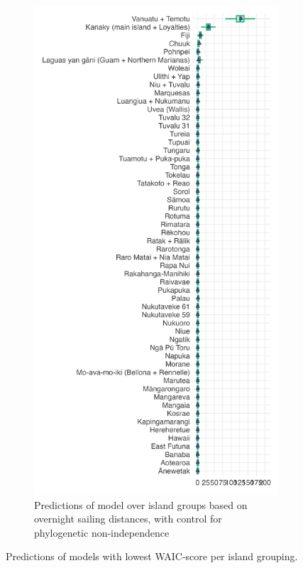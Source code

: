 \documentclass[unnumsec,webpdf,modern,medium]{oup-authoring-template}
\begin{document}
\begin{figure}
\begin{subfigure}{0.48\textwidth}
\label{medium_model_predict}
\end{subfigure}%
\hfill
\begin{subfigure}{0.48\textwidth}
  \centering
  \includegraphics[width=1\textwidth]{brms_predict_SBZR_control_phylo.png}
  \caption{Predictions of model over island groups based on overnight sailing distances, with control for phylogenetic non-independence}
\label{SBZR_model_predict}
\end{subfigure}
\caption{Predictions of models with lowest WAIC-score per island grouping.}
\label{prediction_plot}
\end{figure}
\end{document}
